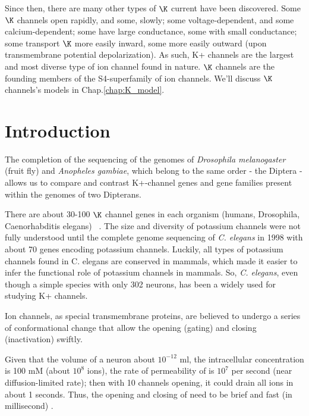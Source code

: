 Since then, there are many other types of $\K$ current have been discovered.
Some $\K$ channels open rapidly, and some, slowly; some
voltage-dependent, and some calcium-dependent; some have large conductance, some
with small conductance; some transport $\K$ more easily inward, some more easily
outward (upon transmembrane potential depolarization).
As such, K+ channels are the largest and most diverse type of ion channel
found in nature. $\K$ channels are the founding members of the S4-superfamily of ion
channels. We'll discuss $\K$ channels's models in Chap.\ref{chap:K_model}.

\section{Introduction}
\label{sec:introduction-4} 

The completion of the sequencing of the genomes of {\it Drosophila melanogaster}
(fruit fly) and {\it Anopheles gambiae}, which belong to the same order - the
Diptera - allows us to compare and contrast K+-channel genes and gene families
present within the genomes of two Dipterans.

There are about 30-100 $\K$ channel genes in each organism (humans, Drosophila,
Caenorhabditis elegans) ~\citep{Miller2000}.
The size and diversity of potassium channels were not fully understood until the
complete genome sequencing of {\it C. elegans} in 1998 with about 70 genes
encoding potassium channels. Luckily, all types of potassium channels found in
C. elegans are conserved in mammals, which made it easier to infer the
functional role of potassium channels in mammals.
So, {\it C. elegans}, even though a simple species with only 302 neurons, has
been a widely used for studying K+ channels.

\begin{mdframed}
  Ion channels, as special transmembrane proteins, are believed to
  undergo a series of conformational change that allow the opening
  (gating) and closing (inactivation) swiftly. 
  
  Given that the volume of a neuron about $10^{-12}$ ml, the intracellular
   concentration is 100 mM (about $10^8$ ions), the rate of permeability
  of  is $10^7$ per second (near diffusion-limited rate); then with 10
  channels opening, it could drain all  ions in about 1 seconds. Thus,
  the opening and closing of  need to be brief and fast (in millisecond)
  \citep{choe2002pcs}.
\end{mdframed}


